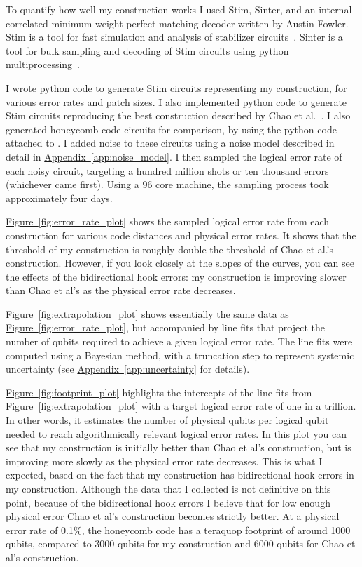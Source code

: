 \documentclass[onecolumn,unpublished,a4paper]{quantumarticle}
\theoremstyle{definition}
\theoremstyle{definition}
\theoremstyle{definition}
\DeclareRobustCommand{\app}[1]{\hyperref[app:#1]{Appendix~\ref*{app:#1}}}
\newcommand{\fig}[1]{\hyperref[fig:#1]{Figure~\ref*{fig:#1}}}
\begin{document}
To quantify how well my construction works I used Stim, Sinter, and an internal correlated minimum weight perfect matching decoder written by Austin Fowler.
Stim is a tool for fast simulation and analysis of stabilizer circuits~\cite{gidney2021stim}.
Sinter is a tool for bulk sampling and decoding of Stim circuits using python multiprocessing~\cite{sinter-source}.

I wrote python code to generate Stim circuits representing my construction, for various error rates and patch sizes.
I also implemented python code to generate Stim circuits reproducing the best construction described by Chao et al.~\cite{chao2020optimization}.
I also generated honeycomb code circuits for comparison, by using the python code attached to \cite{gidney2022planarhoneycomb}.
I added noise to these circuits using a noise model described in detail in \app{noise_model}.
I then sampled the logical error rate of each noisy circuit, targeting a hundred million shots or ten thousand errors (whichever came first).
Using a 96 core machine, the sampling process took approximately four days.

\fig{error_rate_plot} shows the sampled logical error rate from each construction for various code distances and physical error rates.
It shows that the threshold of my construction is roughly double the threshold of Chao et al.'s construction.
However, if you look closely at the slopes of the curves, you can see the effects of the bidirectional hook errors: my construction is improving slower than Chao et al's as the physical error rate decreases.

\fig{extrapolation_plot} shows essentially the same data as \fig{error_rate_plot}, but accompanied by line fits that project the number of qubits required to achieve a given logical error rate.
The line fits were computed using a Bayesian method, with a truncation step to represent systemic uncertainty (see \app{uncertainty} for details).

\fig{footprint_plot} highlights the intercepts of the line fits from \fig{extrapolation_plot} with a target logical error rate of one in a trillion.
In other words, it estimates the number of physical qubits per logical qubit needed to reach algorithmically relevant logical error rates.
In this plot you can see that my construction is initially better than Chao et al's construction, but is improving more slowly as the physical error rate decreases.
This is what I expected, based on the fact that my construction has
bidirectional hook errors in my construction.
Although the data that I collected is not definitive on this point, because of
the bidirectional hook errors I believe that for low enough physical error Chao et al's construction becomes strictly better.
At a physical error rate of 0.1\%, the honeycomb code has a teraquop footprint of around 1000 qubits, compared to 3000 qubits for my construction and 6000 qubits for Chao et al's construction.
\end{document}
